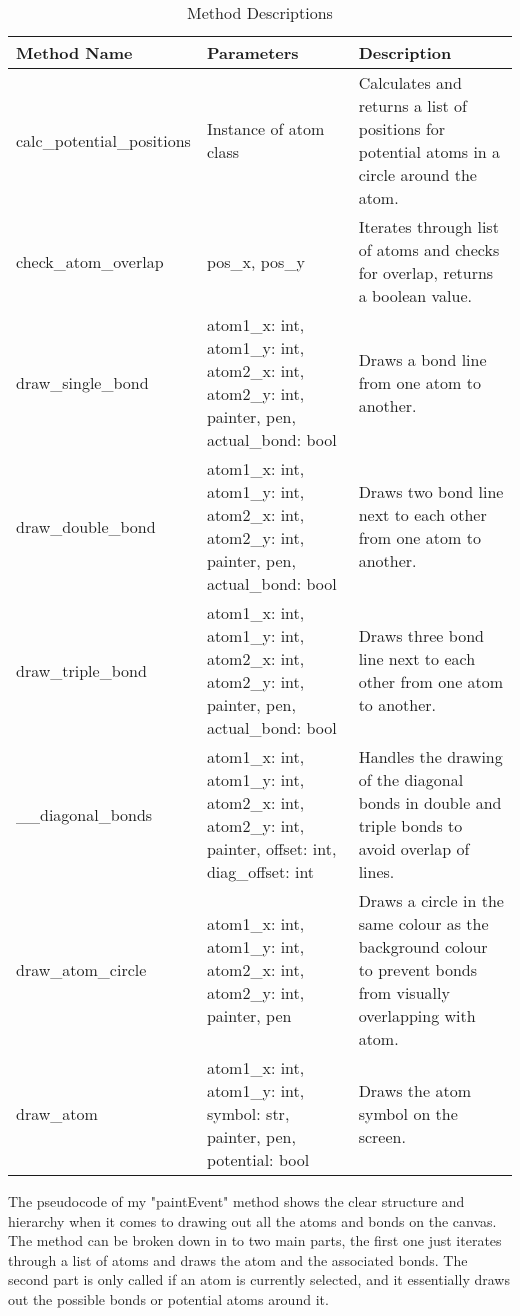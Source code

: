 \documentclass[a4paper,12pt]{article}
\begin{document}
\begin{table}[htbp]
    \centering
    \begin{tabularx}{\textwidth}{|X|X|X|}
        \hline
        \textbf{Method Name} & \textbf{Parameters} & \textbf{Description}\\
        \hline
        calc\_potential\_positions & Instance of atom class & Calculates and returns a list of positions for potential atoms in a circle around the atom. \\
        \hline
        check\_atom\_overlap & pos\_x, pos\_y & Iterates through list of atoms and checks for overlap, returns a boolean value. \\
        \hline
        draw\_single\_bond & atom1\_x: int, atom1\_y: int, atom2\_x: int, atom2\_y: int, painter, pen, actual\_bond: bool & Draws a bond line from one atom to another. \\
        \hline
        draw\_double\_bond & atom1\_x: int, atom1\_y: int, atom2\_x: int, atom2\_y: int, painter, pen, actual\_bond: bool & Draws two bond line next to each other from one atom to another. \\
        \hline
        draw\_triple\_bond & atom1\_x: int, atom1\_y: int, atom2\_x: int, atom2\_y: int, painter, pen, actual\_bond: bool & Draws three bond line next to each other from one atom to another. \\
        \hline
        \_\_diagonal\_bonds & atom1\_x: int, atom1\_y: int, atom2\_x: int, atom2\_y: int, painter, offset: int, diag\_offset: int & Handles the drawing of the diagonal bonds in double and triple bonds to avoid overlap of lines. \\
        \hline
        draw\_atom\_circle & atom1\_x: int, atom1\_y: int, atom2\_x: int, atom2\_y: int, painter, pen & Draws a circle in the same colour as the background colour to prevent bonds from visually overlapping with atom. \\
        \hline
        draw\_atom & atom1\_x: int, atom1\_y: int, symbol: str, painter, pen, potential: bool & Draws the atom symbol on the screen. \\
        \hline
    \end{tabularx}
    \caption{Method Descriptions}
    \label{tab:methods}
\end{table}

\newpage

The pseudocode of my "paintEvent" method shows the clear structure and hierarchy when it comes to drawing out all the atoms and bonds on the canvas. The method can be broken down in to two main parts, the first one just iterates through a list of atoms and draws the atom and the associated bonds. The second part is only called if an atom is currently selected, and it essentially draws out the possible bonds or potential atoms around it.
\end{document}
